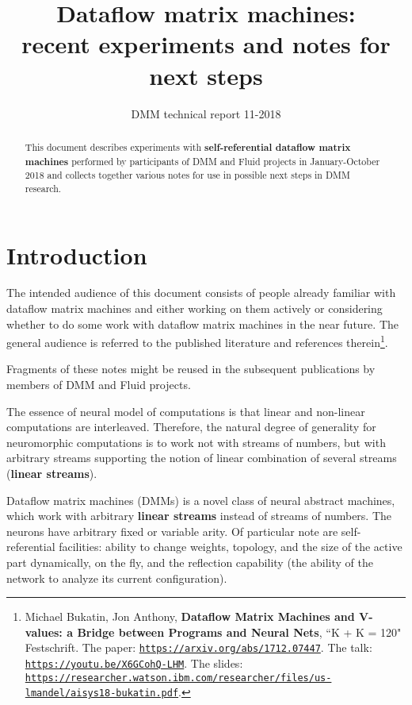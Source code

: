 \documentclass{article}
\title{Dataflow matrix machines:\\ recent experiments and notes for next steps}
\author{DMM technical report 11-2018}
\newcommand{\msblue}[1]{{\color{myblue} #1}}
\begin{document}
\maketitle


\begin{abstract}
This document describes experiments with \msblue{\bf self-referential dataflow matrix machines} performed  by participants of DMM and Fluid projects in January-October 2018
and collects together various notes for use in possible next steps in DMM research.
\end{abstract}

\tableofcontents

\section*{Introduction}

The intended audience of this document consists of people already familiar with dataflow matrix machines and either working on them
actively or considering whether to do some work with dataflow matrix machines in the near future. The general audience is referred to
the published literature and references therein\footnote{Michael Bukatin, Jon Anthony, {\bf Dataflow Matrix Machines and V-values: a Bridge between Programs and Neural Nets}, ``K + K = 120" Festschrift.
The paper: \href{https://arxiv.org/abs/1712.07447}{\tt https://arxiv.org/abs/1712.07447}. The talk: \href{https://youtu.be/X6GCohQ-LHM}{\tt https://youtu.be/X6GCohQ-LHM}. The slides:
\href{https://researcher.watson.ibm.com/researcher/files/us-lmandel/aisys18-bukatin.pdf}{\tt https://researcher.watson.ibm.com/researcher/files/us-lmandel/aisys18-bukatin.pdf}.
}.

Fragments of these notes might be reused in the subsequent publications by members of DMM and Fluid projects.






The essence of neural model of computations is that linear and non-linear computations are interleaved. Therefore, the natural
degree of generality for neuromorphic computations is to work not with streams of numbers, but with arbitrary streams
supporting the notion of linear combination of several streams ({\bf linear streams}).

Dataflow matrix machines (DMMs) is a novel class of neural abstract machines, which work with
 arbitrary {\bf linear streams} instead of streams of numbers. The neurons have
arbitrary fixed or variable arity. Of particular note are
self-referential facilities: ability to change weights, topology, and the size of the active part dynamically, on the fly,
and the reflection capability (the ability of the network to analyze its current configuration).
\end{document}
